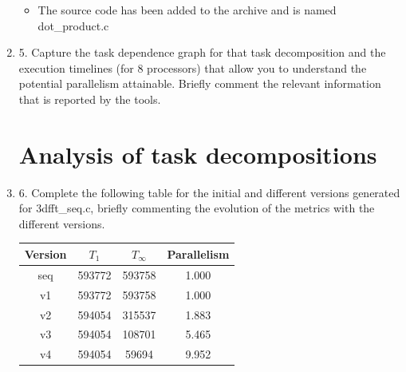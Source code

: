 \documentclass[12pt]{article}
\begin{document}
\begin{enumerate}
%
\begin{itemize}
	\item[] The source code has been added to the archive and is named dot\_product.c
\end{itemize}

\item[] 5. Capture the task dependence graph for that task decomposition and the execution timelines (for 8 processors) that allow you to understand the potential parallelism attainable. Briefly comment the relevant information that is reported by the tools.

\begin{figure}[H]%
\centering
{}%
\label{fig:test}%
\end{figure}
\begin{figure}[H]%
\centering
{}%
\end{figure}





\section*{Analysis of task decompositions}

\item[] 6. Complete the following table for the initial and different versions generated for 3dfft\_seq.c, briefly
commenting the evolution of the metrics with the different versions.
\begin{center}
\begin{tabular}{| c || c | c | c | }
  \hline
  \textbf{Version} & $T_1$ & $T_{\infty}$ & \textbf{Parallelism}\\ \hline \hline
  seq & 593772 & 593758 & 1.000\\ \hline
  v1 & 593772 & 593758 & 1.000\\ \hline
  v2  & 594054 & 315537 & 1.883 \\ \hline
  v3  &  594054 & 108701 & 5.465\\ \hline
  v4  & 594054 & 59694 & 9.952 \\
  \hline


\end{tabular}
\end{center}
\end{enumerate}
\end{document}
